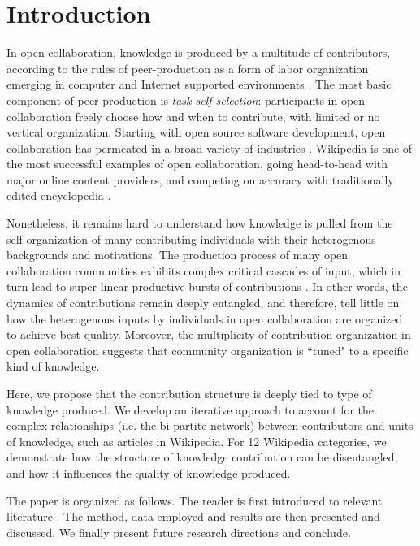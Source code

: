 \section{Introduction}
In open collaboration, knowledge is produced by a multitude of contributors, according to the rules of peer-production as a form of labor organization emerging in computer and Internet supported environments \cite{benkler2002}. The most basic component of peer-production is {\it task self-selection}: participants in open collaboration freely choose how and when to contribute, with limited or no vertical organization.  Starting with open source software development, open collaboration has permeated in a broad variety of industries \cite{benkler2011leviathan}. Wikipedia is one of the most successful examples of open collaboration, going head-to-head with major online content providers, and competing on accuracy with traditionally edited encyclopedia \cite{giles2005internet}. 

Nonetheless, it remains hard to understand how knowledge is pulled from the self-organization of many contributing individuals with their heterogenous backgrounds and motivations. The production process of many open collaboration communities exhibits complex critical cascades of input, which in turn lead to super-linear productive bursts of contributions \cite{sornette2014howmuch}. In other words, the dynamics of contributions remain deeply entangled, and therefore, tell little on how the heterogenous inputs by individuals in open collaboration are organized to achieve best quality. Moreover, the multiplicity of contribution organization in open collaboration suggests that community organization is ``tuned" to a specific kind of knowledge. 

Here, we propose that the contribution structure is deeply tied to type of knowledge produced. We develop an iterative approach to account for the complex relationships (i.e. the bi-partite network) between contributors and units of knowledge, such as articles in Wikipedia. For 12 Wikipedia categories, we demonstrate how the structure of knowledge contribution can be disentangled, and how it influences the quality of knowledge produced.

The paper is organized as follows. The reader is first introduced to relevant literature . The method, data employed and results are then presented and discussed. We finally present future research directions and conclude.
